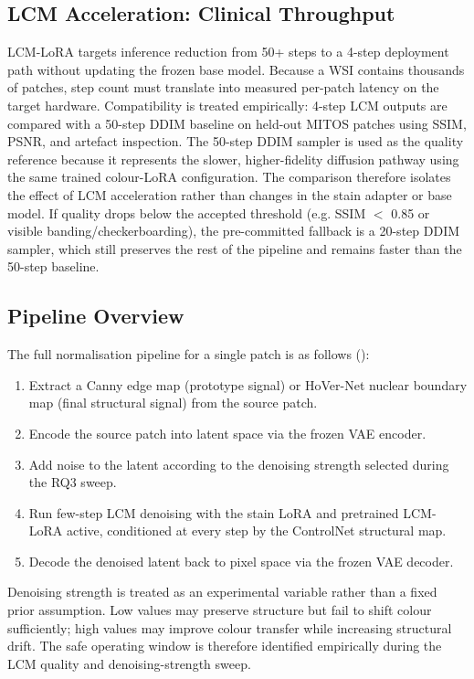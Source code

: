 \documentclass[a4paper,twoside,12pt]{report}
\begin{document}
\subsection{LCM Acceleration: Clinical Throughput}

LCM-LoRA targets inference reduction from 50+ steps to a 4-step deployment path without updating the frozen base model. Because a WSI contains thousands of patches, step count must translate into measured per-patch latency on the target hardware. Compatibility is treated empirically: 4-step LCM outputs are compared with a 50-step DDIM baseline on held-out MITOS patches using SSIM, PSNR, and artefact inspection. The 50-step DDIM sampler is used as the quality reference because it represents the slower, higher-fidelity diffusion pathway using the same trained colour-LoRA configuration. The comparison therefore isolates the effect of LCM acceleration rather than changes in the stain adapter or base model. If quality drops below the accepted threshold (e.g. SSIM $<$ 0.85 or visible banding/checkerboarding), the pre-committed fallback is a 20-step DDIM sampler, which still preserves the rest of the pipeline and remains faster than the 50-step baseline.

\subsection{Pipeline Overview}

The full normalisation pipeline for a single patch is as follows ():

\begin{enumerate}
    \item Extract a Canny edge map (prototype signal) or HoVer-Net nuclear boundary map (final structural signal) from the source patch.
    \item Encode the source patch into latent space via the frozen VAE encoder.
    \item Add noise to the latent according to the denoising strength selected during the RQ3 sweep.
    \item Run few-step LCM denoising with the stain LoRA and pretrained LCM-LoRA active, conditioned at every step by the ControlNet structural map.
    \item Decode the denoised latent back to pixel space via the frozen VAE decoder.
\end{enumerate}

Denoising strength is treated as an experimental variable rather than a fixed prior assumption. Low values may preserve structure but fail to shift colour sufficiently; high values may improve colour transfer while increasing structural drift. The safe operating window is therefore identified empirically during the LCM quality and denoising-strength sweep.
\end{document}
